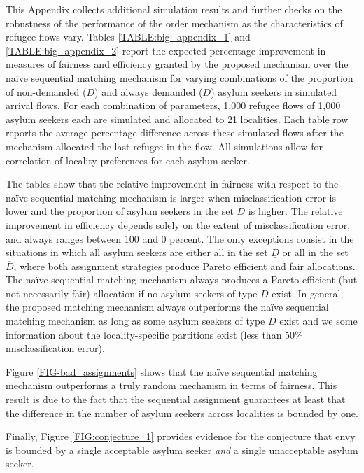 \documentclass[12pt,fleqn]{article}
\begin{document}
This Appendix collects additional simulation results and further checks on the robustness of the performance of the order mechanism as the characteristics of refugee flows vary. Tables \ref{TABLE:big_appendix_1} and \ref{TABLE:big_appendix_2} report the expected percentage improvement in measures of fairness and efficiency granted by the proposed mechanism over the na\"{i}ve sequential matching mechanism for varying combinations of the proportion of non-demanded ($\underline{D}$) and always demanded ($\overline{D}$) asylum seekers in simulated arrival flows. For each combination of parameters, 1,000 refugee flows of 1,000 asylum seekers each are simulated and allocated to 21 localities. Each table row reports the average percentage difference across these simulated flows after the mechanism allocated the last refugee in the flow. All simulations allow for correlation of locality preferences for each asylum seeker.

The tables show that the relative improvement in fairness with respect to the na\"{i}ve sequential matching mechanism is larger when misclassification error is lower and the proportion of asylum seekers in the set $D$ is higher. The relative improvement in efficiency depends solely on the extent of misclassification error, and always ranges between 100 and 0 percent. The only exceptions consist in the situations in which all asylum seekers are either all in the set $\underline{D}$ or all in the set $\overline{D}$, where both assignment strategies produce Pareto efficient and fair allocations. The na\"{i}ve sequential matching mechanism always produces a Pareto efficient (but not necessarily fair) allocation if no asylum seekers of type $D$ exist. In general, the proposed matching mechanism always outperforms the na\"{i}ve sequential matching mechanism as long as some asylum seekers of type $D$ exist and we some information about the locality-specific partitions exist (less than 50\% misclassification error). 

Figure \ref{FIG-bad_assignments} shows that the na\"{i}ve sequential matching mechanism outperforms a truly random mechanism in terms of fairness. This result is due to the fact that the sequential assignment guarantees at least that the difference in the number of asylum seekers across localities is bounded by one.

Finally, Figure \ref{FIG:conjecture_1} provides evidence for the conjecture that envy is bounded by a single acceptable asylum seeker \emph{and} a single unacceptable asylum seeker.
\end{document}
